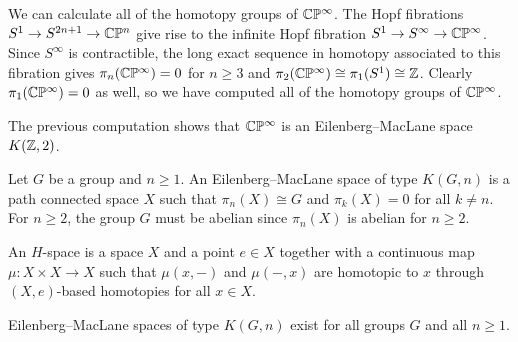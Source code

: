 \documentclass[12pt]{article}
\begin{document}
\begin{example}
    We can calculate all of the homotopy groups of $\mathbb{C}\mathbb{P}^\infty$. The Hopf fibrations $S^1 \to S^{2n+1} \to \mathbb{C}\mathbb{P}^n$ give rise to the infinite Hopf fibration $S^1 \to S^\infty \to \mathbb{C}\mathbb{P}^\infty$. Since $S^\infty$ is contractible, the long exact sequence in homotopy associated to this fibration gives $\pi_n(\mathbb{C}\mathbb{P}^\infty) = 0$ for $n\ge 3$ and $\pi_2(\mathbb{C}\mathbb{P}^\infty) \cong \pi_1(S^1) \cong \mathbb{Z}$. Clearly $\pi_1(\mathbb{C}\mathbb{P}^\infty) = 0$ as well, so we have computed all of the homotopy groups of $\mathbb{C}\mathbb{P}^\infty$.
\end{example}

The previous computation shows that $\mathbb{C}\mathbb{P}^\infty$ is an Eilenberg--MacLane space $K(\mathbb{Z},2)$. 

\begin{definition}
    Let $G$ be a group and $n\ge 1$. An Eilenberg--MacLane space of type $K(G,n)$ is a path connected space $X$ such that $\pi_n(X) \cong G$ and $\pi_k(X) = 0$ for all $k\neq n$. For $n\ge 2$, the group $G$ must be abelian since $\pi_n(X)$ is abelian for $n\ge 2$.
\end{definition}

\begin{definition}
    An $H$-space is a space $X$ and a point $e\in X$ together with a continuous map $\mu: X\times X \to X$ such that $\mu(x,-)$ and $\mu(-,x)$ are homotopic to $x$ through $(X,e)$-based homotopies for all $x\in X$. 
\end{definition}

\begin{theorem}
    Eilenberg--MacLane spaces of type $K(G,n)$ exist for all groups $G$ and all $n\ge 1$.
\end{theorem}
\end{document}
